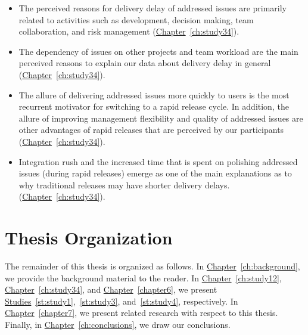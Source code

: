 \begin{itemize}

	\item The perceived reasons for delivery delay of addressed issues are
		primarily related to activities such as development, decision
		making, team collaboration, and risk management
		(\hyperref[ch:study34]{Chapter}~\ref{ch:study34}). 

	\item  The dependency of issues on other projects and team workload are the main
		perceived reasons to explain our data about delivery delay in
		general (\hyperref[ch:study34]{Chapter}~\ref{ch:study34}).  

	\item The allure of delivering addressed issues more quickly to users is
		the most recurrent motivator for switching to a rapid release
		cycle. In addition, the allure of improving management
		flexibility and quality of addressed issues are other advantages
		of rapid releases that are perceived by our participants
		(\hyperref[ch:study34]{Chapter}~\ref{ch:study34}).

	\item Integration rush and the increased time that is spent on polishing
		addressed issues (during rapid releases) emerge as one of the
		main explanations as to why traditional releases may have
		shorter delivery delays.
		(\hyperref[ch:study34]{Chapter}~\ref{ch:study34}).

\end{itemize}

\section{Thesis Organization}

The remainder of this thesis is organized as follows. In
\hyperref[ch:background]{Chapter}~\ref{ch:background}, we provide the background
material to the reader. In \hyperref[ch:study12]{Chapter}~\ref{ch:study12},
\hyperref[ch:study34]{Chapter}~\ref{ch:study34}, and
\hyperref[chapter6]{Chapter}~\ref{chapter6}, we present
\hyperref[st:study1]{Studies}~\ref{st:study1},~\ref{st:study3},
and~\ref{st:study4}, respectively. In
\hyperref[chapter7]{Chapter}~\ref{chapter7}, we present related research with
respect to this thesis. Finally, in
\hyperref[ch:conclusions]{Chapter}~\ref{ch:conclusions}, we draw our
conclusions.

